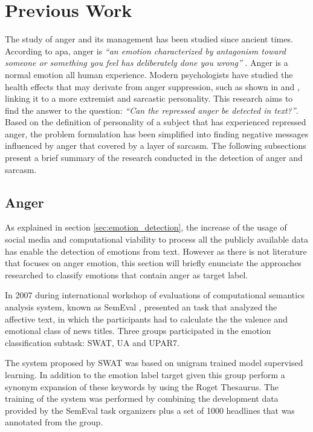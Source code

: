 
\section{Previous Work}
\label{sec:previous_work}

The study of anger and its management has been studied since ancient times. According to \acrfull{apa}, anger is \textit{``an emotion characterized by antagonism toward someone or something you feel has deliberately done you wrong''} \cite{angerAPA}. Anger is a normal emotion all human experience. Modern psychologists have studied the health effects that may derivate from anger suppression, such as shown in \cite{kemp1995anger} and \cite{staicu2010anger}, linking it to a more extremist and sarcastic personality. This research aims to find the answer to the question: \textit{``Can the repressed anger be detected in text?''}. Based on the definition of personality of a subject that has experienced repressed anger, the problem formulation has been simplified into finding negative messages influenced by anger that covered by a layer of sarcasm. The following subsections present a brief summary of the research conducted in the detection of anger and sarcasm.

\subsection{Anger}
\label{subsec:anger}

As explained in section \ref{sec:emotion_detection}, the increase of the usage of social media and computational viability to process all the publicly available data has enable the detection of emotions from text. However as there is not literature that focuses on anger emotion, this section will briefly enunciate the approaches researched to classify emotions that contain anger as target label.

In 2007 during international workshop of evaluations of computational semantics analysis system, known as SemEval \cite{SemEvalPortal}, presented an task that analyzed the affective text, in which the participants had to calculate the the valence and emotional class of news titles. Three groups participated in the emotion classification subtask: SWAT, UA and UPAR7. 

The system proposed by SWAT was based on unigram trained model supervised learning. In addition to the emotion label target given this group perform a synonym expansion of these keywords by using the Roget Thesaurus. The training of the system was performed by combining the development data provided by the SemEval task organizers plus a set of 1000 headlines that was annotated from the group.

